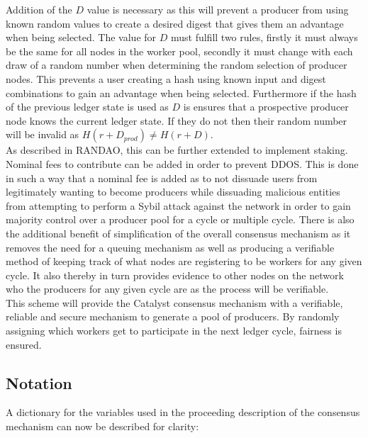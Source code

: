 \documentclass{article}
\begin{document}
Addition of the $D$ value is necessary as this will prevent a producer from using known random values to create a desired digest that gives them an advantage when being selected. The value for $D$ must fulfill two rules, firstly it must always be the same for all nodes in the worker pool, secondly it must change with each draw of a random number when determining the random selection of producer nodes. This prevents a user creating a hash using known input and digest combinations to gain an advantage when being selected. Furthermore if the hash of the previous ledger state is used as $D$ is ensures that a prospective producer node knows the current ledger state. If they do not then their random number will be invalid as $H(r + D_{prod}) \neq H(r + D)$. \\

As described in RANDAO, this can be further extended to implement staking. Nominal fees to contribute can be added in order to prevent DDOS. This is done in such a way that a nominal fee is added as to not dissuade users from legitimately wanting to become producers while dissuading malicious entities from attempting to perform a Sybil attack against the network in order to gain majority control over a producer pool for a cycle or multiple cycle. There is also the additional benefit of simplification of the overall consensus mechanism as it removes the need for a queuing mechanism as well as producing a verifiable method of keeping track of what nodes are registering to be workers for any given cycle. It also thereby in turn provides evidence to other nodes on the network who the producers for any given cycle are as the process will be verifiable. \\

This scheme will provide the Catalyst consensus mechanism with a verifiable, reliable and secure mechanism to generate a pool of producers. By randomly assigning which workers get to participate in the next ledger cycle, fairness is ensured. \\




\subsection{Notation} 

A dictionary for the variables used in the proceeding description of the consensus mechanism can now be described for clarity:
\end{document}
